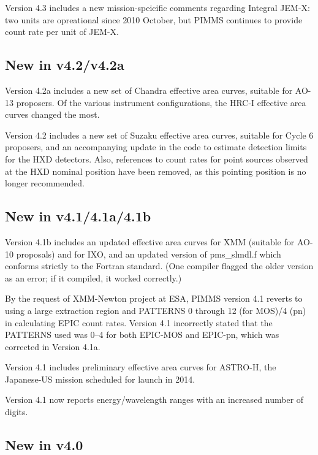 \documentclass[11pt]{article}
\begin{document}
Version 4.3 includes a new mission-speicific comments regarding Integral
JEM-X: two units are opreational since 2010 October, but PIMMS continues
to provide count rate per unit of JEM-X.

\subsection{New in v4.2/v4.2a}

Version 4.2a includes a new set of Chandra effective area curves, suitable
for AO-13 proposers.  Of the various instrument configurations, the HRC-I
effective area curves changed the most.

Version 4.2 includes a new set of Suzaku effective area curves, suitable
for Cycle 6 proposers, and an accompanying update in the code to estimate
detection limits for the HXD detectors.  Also, references to count rates
for point sources observed at the HXD nominal position have been removed,
as this pointing position is no longer recommended.

\subsection{New in v4.1/4.1a/4.1b}

Version 4.1b includes an updated effective area curves for XMM (suitable
for AO-10 proposals) and for IXO, and an updated version of pms\_slmdl.f
which conforms strictly to the Fortran standard.  (One compiler flagged
the older version as an error; if it compiled, it worked correctly.)

By the request of XMM-Newton project at ESA, PIMMS version 4.1 reverts
to using a large extraction region and PATTERNS 0 through 12 (for MOS)/4 (pn)
in calculating EPIC count rates.  Version 4.1 incorrectly stated that the
PATTERNS used was 0--4 for both EPIC-MOS and EPIC-pn, which was corrected
in Version 4.1a.

Version 4.1 includes preliminary effective area curves for ASTRO-H,
the Japanese-US mission scheduled for launch in 2014.

Version 4.1 now reports energy/wavelength ranges with an increased
number of digits.

\subsection{New in v4.0}
\end{document}
